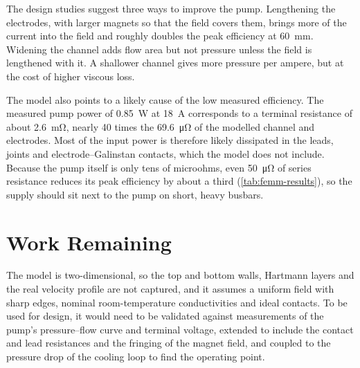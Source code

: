The design studies suggest three ways to improve the pump. Lengthening the
electrodes, with larger magnets so that the field covers them, brings more of the current into
the field and roughly doubles the peak efficiency at \SI{60}{\milli\metre}.
Widening the channel adds flow area but not pressure unless the field is
lengthened with it. A shallower channel gives more pressure per ampere, but at
the cost of higher viscous loss.

The model also points to a likely cause of the low measured efficiency. The
measured pump power of \SI{0.85}{\watt} at \SI{18}{\ampere} corresponds to a
terminal resistance of about \SI{2.6}{\milli\ohm}, nearly 40 times the
\SI{69.6}{\micro\ohm} of the modelled channel and electrodes. Most of the input
power is therefore likely dissipated in the leads, joints and
electrode--Galinstan contacts, which the model does not include. Because the
pump itself is only tens of microohms, even \SI{50}{\micro\ohm} of series
resistance reduces its peak efficiency by about a third
(\cref{tab:femm-results}), so the supply should sit next to the pump on short,
heavy busbars.

\section{Work Remaining}

The model is two-dimensional, so the top and bottom walls, Hartmann layers and
the real velocity profile are not captured, and it assumes a uniform field with
sharp edges, nominal room-temperature conductivities and ideal contacts. To be
used for design, it would need to be validated against measurements of the
pump's pressure--flow curve and terminal voltage, extended to include the
contact and lead resistances and the fringing of the magnet field, and coupled
to the pressure drop of the cooling loop to find the operating point.
